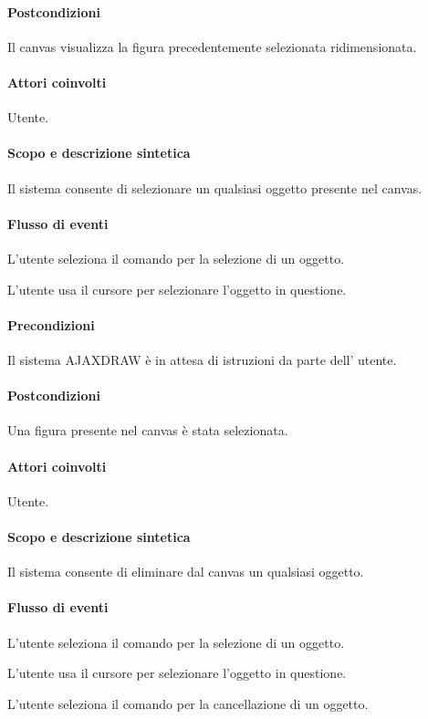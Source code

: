 \paragraph{Postcondizioni} Il canvas visualizza la figura precedentemente selezionata ridimensionata.
                   
\paragraph{Attori coinvolti} Utente.
\paragraph{Scopo e descrizione sintetica} Il sistema consente di selezionare un qualsiasi oggetto presente nel canvas.
\paragraph{Flusso di eventi}
\begin{elenconumerato}[\textbf{}]{\subsubsecindent}
\item  L'utente seleziona il comando per la selezione di un oggetto.
\item  L'utente usa il cursore per selezionare l'oggetto in questione.
\end{elenconumerato}
\paragraph{Precondizioni} Il sistema AJAXDRAW \`e in attesa di istruzioni da parte dell' utente.
\paragraph{Postcondizioni} Una figura presente nel canvas \`e stata selezionata.

\paragraph{Attori coinvolti} Utente.
\paragraph{Scopo e descrizione sintetica} Il sistema consente di eliminare dal canvas un qualsiasi oggetto.
\paragraph{Flusso di eventi}
\begin{elenconumerato}[\textbf{}]{\subsubsecindent}
\item  L'utente seleziona il comando per la selezione di un oggetto.
\item  L'utente usa il cursore per selezionare l'oggetto in questione.
\item  L'utente seleziona il comando per la cancellazione di un oggetto.
\end{elenconumerato}
